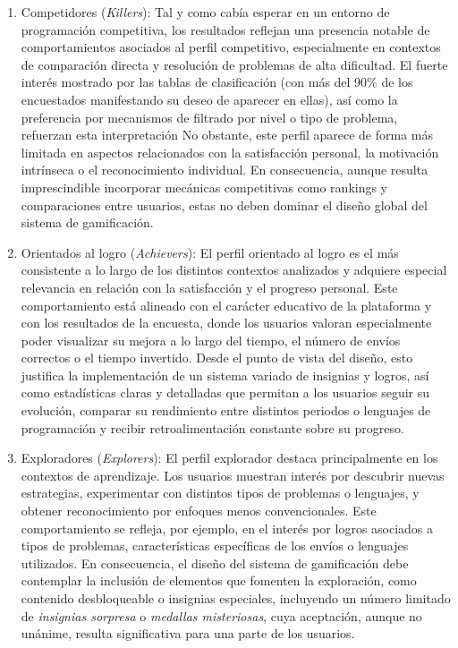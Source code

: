 \begin{enumerate}
    \item Competidores (\textit{Killers}): Tal y como cabía esperar en un entorno de programación competitiva, los resultados reflejan una presencia notable de comportamientos asociados al perfil competitivo, especialmente en contextos de comparación directa y resolución de problemas de alta dificultad. El fuerte interés mostrado por las tablas de clasificación (con más del 90\% de los encuestados manifestando su deseo de aparecer en ellas), así como la preferencia por mecanismos de filtrado por nivel o tipo de problema, refuerzan esta interpretación
 No obstante, este perfil aparece de forma más limitada en aspectos relacionados con la satisfacción personal, la motivación intrínseca o el reconocimiento individual. En consecuencia, aunque resulta imprescindible incorporar mecánicas competitivas como rankings y comparaciones entre usuarios, estas no deben dominar el diseño global del sistema de gamificación.
    
    \item Orientados al logro (\textit{Achievers}): El perfil orientado al logro es el más consistente a lo largo de los distintos contextos analizados y adquiere especial relevancia en relación con la satisfacción y el progreso personal. Este comportamiento está alineado con el carácter educativo de la plataforma y con los resultados de la encuesta, donde los usuarios valoran especialmente poder visualizar su mejora a lo largo del tiempo, el número de envíos correctos o el tiempo invertido.  
Desde el punto de vista del diseño, esto justifica la implementación de un sistema variado de insignias y logros, así como estadísticas claras y detalladas que permitan a los usuarios seguir su evolución, comparar su rendimiento entre distintos periodos o lenguajes de programación y recibir retroalimentación constante sobre su progreso.
    
    \item Exploradores (\textit{Explorers}): El perfil explorador destaca principalmente en los contextos de aprendizaje. Los usuarios muestran interés por descubrir nuevas estrategias, experimentar con distintos tipos de problemas o lenguajes, y obtener reconocimiento por enfoques menos convencionales. Este comportamiento se refleja, por ejemplo, en el interés por logros asociados a tipos de problemas, características específicas de los envíos o lenguajes utilizados.  
En consecuencia, el diseño del sistema de gamificación debe contemplar la inclusión de elementos que fomenten la exploración, como contenido desbloqueable o insignias especiales, incluyendo un número limitado de \textit{insignias sorpresa} o \textit{medallas misteriosas}, cuya aceptación, aunque no unánime, resulta significativa para una parte de los usuarios.
    

\end{enumerate}
